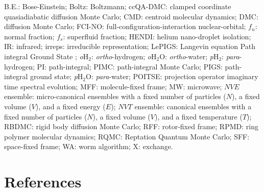 \documentclass[12pt]{iopart}
\newcommand{\pwater}{{\em p}H$_2$O}
\newcommand{\owater}{{\em o}H$_2$O}
\newcommand{\phtwo}{{\em p}H$_2$}
\newcommand{\ohtwo}{{\em o}H$_2$}
\begin{document}
B.E.: Bose-Einstein; Boltz: Boltzmann; ccQA-DMC: clamped coordinate quasiadiabatic diffusion Monte Carlo; CMD: centroid molecular dynamics; DMC: diffusion Monte Carlo; FCI-NO: full-configuration-interaction nuclear-orbital; $f_n$: normal fraction; $f_s$: superfluid fraction; HENDI: helium nano-droplet isolation; IR: infrared; irreps: irreducible representation; LePIGS: Langevin equation Path integral Ground State ; \ohtwo: {\it ortho}-hydrogen; \owater: {\it ortho}-water; \phtwo: {\it para}-hydrogen; PI: path-integral; PIMC: path-integral Monte Carlo; PIGS: path-integral ground state; \pwater: {\it para}-water; POITSE: projection operator imaginary time spectral evolution; MFF: molecule-fixed frame; MW: microwave; $NVE$ ensemble: micro-canonical ensembles with a fixed number of particles ($N$), a fixed volume ($V$), and a fixed energy ($E$); $NVT$ ensemble: canonical ensembles with a fixed number of particles ($N$), a fixed volume ($V$), and a fixed temperature ($T$); RBDMC: rigid body diffusion Monte Carlo; RFF: rotor-fixed frame; RPMD: ring polymer molecular dynamics; RQMC: Reptation Quantum Monte Carlo; SFF: space-fixed frame; WA: worm algorithm; X: exchange.


\section*{References}
\end{document}
